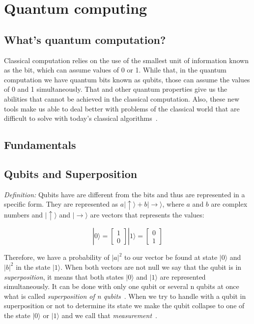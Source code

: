 \documentclass[conference]{IEEEtran}
\begin{document}
\section{Quantum computing}\label{sec:qc}
\subsection{What's quantum computation?}\label{subsec:what's-quantum-computation?}

Classical computation relies on the use of the smallest unit of information known as the bit, which can assume values of
0 or 1.
While that, in the quantum computation we have quantum bits known as qubits, those can
assume the values of 0 and 1 simultaneously.
That and other quantum properties give us the abilities that cannot be achieved in the classical computation.
Also, these new tools make us able to deal better with problems of the classical world that are difficult
to solve with today's classical algorithms~\cite{russon_2017,deutsch1992rapid}.

\subsection{Fundamentals}\label{subsec:fundamentals}

\subsection{Qubits and Superposition}\label{subsec:qubits-and-superposition}

\textit{Definition:} Qubits have are different from the bits and thus are represented in a specific form.
They are represented as \(a|\uparrow\rangle + b|\rightarrow\rangle\), where \(a\) and \(b\) are complex
numbers and \(|\uparrow\rangle\) and \(|\rightarrow\rangle\) are vectors that represents the values:

\[ |0\rangle = \begin{bmatrix} 1 \\ 0\end{bmatrix}  |1\rangle = \begin{bmatrix} 0 \\ 1\end{bmatrix}\]

Therefore, we have a probability of \(|a|^2\) to our vector be found at state \(|0\rangle \) and
\(|b|^2\) in the state \(|1\rangle\).
When both vectors are not null we say that the qubit is in \textit{superposition}, it means that both states
\(|0\rangle\) and \(|1\rangle\) are represented simultaneously.
It can be done with only one qubit or several n qubits at once what is called
\textit{superposition of n qubits}~\cite{yanofsky2008quantum,rieffel2014quantum}.
When we try to handle with a qubit in superposition or not to determine its state we make the
qubit collapse to one of the state \(|0\rangle\) or \(|1\rangle\) and we call that
\textit{measurement}~\cite{yanofsky2008quantum,rieffel2014quantum}.
\end{document}
